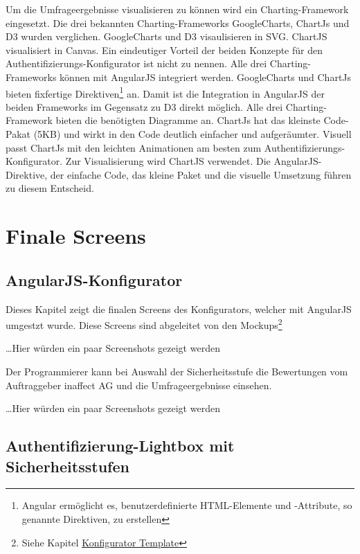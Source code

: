 Um die Umfrageergebnisse visualisieren zu können wird ein
Charting-Framework eingesetzt. Die drei bekannten Charting-Frameworks
GoogleCharts, ChartJs und D3 wurden verglichen. GoogleCharts und D3
visaulisieren in SVG. ChartJS visualisiert in Canvas. Ein eindeutiger
Vorteil der beiden Konzepte für den Authentifizierungs-Konfigurator ist
nicht zu nennen. Alle drei Charting-Frameworks können mit AngularJS
integriert werden. GoogleCharts und ChartJs bieten fixfertige
Direktiven\footnote{Angular ermöglicht es, benutzerdefinierte
  HTML-Elemente und -Attribute, so genannte Direktiven, zu erstellen
  \newpage} an. Damit ist die Integration in AngularJS der beiden
Frameworks im Gegensatz zu D3 direkt möglich. Alle drei
Charting-Framework bieten die benötigten Diagramme an. ChartJs hat das
kleinste Code-Pakat (5KB) und wirkt in den Code deutlich einfacher und
aufgeräumter. Visuell passt ChartJs mit den leichten Animationen am
besten zum Authentifizierungs-Konfigurator. Zur Visualisierung wird
ChartJS verwendet. Die AngularJS-Direktive, der einfache Code, das
kleine Paket und die visuelle Umsetzung führen zu diesem Entscheid.

\section{Finale Screens}\label{finale-screens}

\subsection{AngularJS-Konfigurator}\label{angularjs-konfigurator}

Dieses Kapitel zeigt die finalen Screens des Konfigurators, welcher mit
AngularJS umgestzt wurde. Diese Screens sind abgeleitet von den
Mockups\footnote{Siehe Kapitel
  \protect\hyperlink{konfigurator-template}{Konfigurator Template}}

\ldots{}Hier würden ein paar Screenshots gezeigt werden

Der Programmierer kann bei Auswahl der Sicherheitsstufe die Bewertungen
vom Auftraggeber inaffect AG und die Umfrageergebnisse einsehen.

\ldots{}Hier würden ein paar Screenshots gezeigt werden

\newpage

\subsection{Authentifizierung-Lightbox mit
Sicherheitsstufen}\label{authentifizierung-lightbox-mit-sicherheitsstufen}

